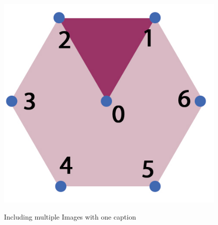 \documentclass{beamer}
\begin{document}
\begin{frame}
\begin{figure}
\begin{center}
{\includegraphics[scale=0.1]{./images/jpgHexGridStruc.jpg}
  }\quad
  \caption{Including multiple Images with one caption}\vspace{-10mm}
  \label{fig:stab_chart}
  \end{center}
\end{figure}

\end{frame}
\end{document}
